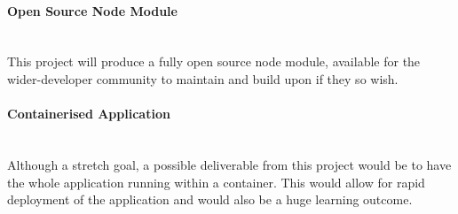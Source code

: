 \paragraph{Open Source Node Module}\mbox{}\\
This project will produce a fully \gls{open source} node module, available for the wider-developer community to maintain and build upon if they so wish.

\paragraph{Containerised Application}\mbox{}\\
Although a stretch goal, a possible deliverable from this project would be to have the whole application running within a container. This would allow for rapid deployment of the application and would also be a huge learning outcome.
